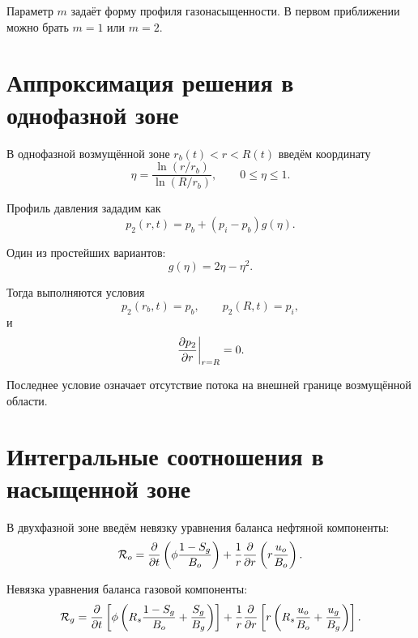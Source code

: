 \documentclass[12pt,a4paper]{article}
\begin{document}
Параметр $m$ задаёт форму профиля газонасыщенности. В первом приближении можно брать $m=1$ или $m=2$.

\section{Аппроксимация решения в однофазной зоне}

В однофазной возмущённой зоне $r_b(t)<r<R(t)$ введём координату
\begin{equation}
    \eta = \frac{\ln(r/r_b)}{\ln(R/r_b)},
    \qquad
    0 \leq \eta \leq 1.
\end{equation}

Профиль давления зададим как
\begin{equation}
    p_2(r,t)
    =
    p_b + (p_i-p_b)g(\eta).
\end{equation}

Один из простейших вариантов:
\begin{equation}
    g(\eta)=2\eta-\eta^2.
\end{equation}

Тогда выполняются условия
\begin{equation}
    p_2(r_b,t)=p_b,
    \qquad
    p_2(R,t)=p_i,
\end{equation}
и
\begin{equation}
    \left.\pdv{p_2}{r}\right|_{r=R}=0.
\end{equation}

Последнее условие означает отсутствие потока на внешней границе возмущённой области.

\section{Интегральные соотношения в насыщенной зоне}

В двухфазной зоне введём невязку уравнения баланса нефтяной компоненты:
\begin{equation}
    \mathcal{R}_o
    =
    \pdv{}{t}
    \left(
        \phi \frac{1-S_g}{B_o}
    \right)
    +
    \frac{1}{r}\pdv{}{r}
    \left(
        r \frac{u_o}{B_o}
    \right).
\end{equation}

Невязка уравнения баланса газовой компоненты:
\begin{equation}
    \mathcal{R}_g
    =
    \pdv{}{t}
    \left[
        \phi
        \left(
            R_s \frac{1-S_g}{B_o}
            +
            \frac{S_g}{B_g}
        \right)
    \right]
    +
    \frac{1}{r}\pdv{}{r}
    \left[
        r
        \left(
            R_s \frac{u_o}{B_o}
            +
            \frac{u_g}{B_g}
        \right)
    \right].
\end{equation}
\end{document}
